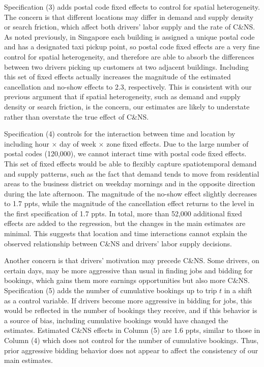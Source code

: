 \documentclass[reviewmode]{restud}
\begin{document}
Specification (3) adds postal code fixed effects to control for spatial heterogeneity. The concern is that different locations may differ in demand and supply density or search friction, which affect both drivers' labor supply and the rate of C\&NS. As noted previously, in Singapore each building is assigned a unique postal code and has a designated taxi pickup point, so postal code fixed effects are a very fine control for spatial heterogeneity, and therefore are able to absorb the differences between two drivers picking up customers at two adjacent buildings. Including this set of fixed effects actually increases the magnitude of the estimated cancellation and no-show effects to 2.3, respectively. This is consistent with our previous argument that if spatial heterogeneity, such as demand and supply density or search friction, is the concern, our estimates are likely to understate rather than overstate the true effect of C\&NS.

Specification (4) controls for the interaction between time and location by including hour $\times$ day of week $\times$ zone fixed effects. Due to the large number of postal codes (120,000), we cannot interact time with postal code fixed effects. 
This set of fixed effects would be able to flexibly capture spatiotemporal demand and supply patterns, such as the fact that demand tends to move from residential areas to the business district on weekday mornings and in the opposite direction during the late afternoon. The magnitude of the no-show effect slightly decreases to 1.7 ppts, while the magnitude of the cancellation effect returns to the level in the first specification of 1.7 ppts. In total, more than 52,000 additional fixed effects are added to the regression, but the changes in the main estimates are minimal. This suggests that location and time interactions cannot explain the observed relationship between C\&NS and drivers' labor supply decisions.

Another concern is that drivers' motivation may precede C\&NS. Some drivers, on certain days, may be more aggressive than usual in finding jobs and bidding for bookings, which gains them more earnings opportunities but also more C\&NS. Specification (5) adds the number of cumulative bookings up to trip $t$ in a shift as a control variable. If drivers become more aggressive in bidding for jobs, this would be reflected in the number of bookings they receive, and if this behavior is a source of bias, including cumulative bookings would have changed the estimates. Estimated C\&NS effects in Column (5) are 1.6 ppts, similar to those in Column (4) which does not control for the number of cumulative bookings. Thus, prior aggressive bidding behavior does not appear to affect the consistency of our main estimates.
\end{document}

